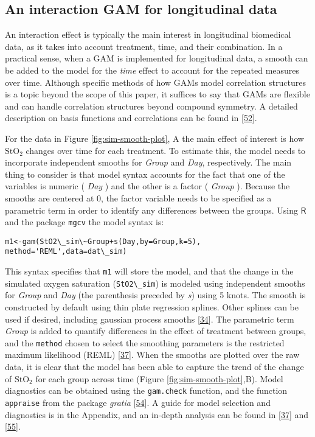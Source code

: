 \documentclass[
]{article}
\newcommand{\passthrough}[1]{#1}
\begin{document}
\hypertarget{an-interaction-gam-for-longitudinal-data}{%
\subsection{An interaction GAM for longitudinal data}\label{an-interaction-gam-for-longitudinal-data}}

An interaction effect is typically the main interest in longitudinal biomedical data, as it takes into account treatment, time, and their combination. In a practical sense, when a GAM is implemented for longitudinal data, a smooth can be added to the model for the \emph{time} effect to account for the repeated measures over time. Although specific methods of how GAMs model correlation structures is a topic beyond the scope of this paper, it suffices to say that GAMs are flexible and can handle correlation structures beyond compound symmetry. A detailed description on basis functions and correlations can be found in {[}\protect\hyperlink{ref-hefley2017}{52}{]}.

For the data in Figure \ref{fig:sim-smooth-plot}, A the main effect of interest is how \(\mbox{StO}_2\) changes over time for each treatment. To estimate this, the model needs to incorporate independent smooths for \emph{Group} and \emph{Day}, respectively. The main thing to consider is that model syntax accounts for the fact that one of the variables is numeric ( \emph{Day} ) and the other is a factor ( \emph{Group} ). Because the smooths are centered at 0, the factor variable needs to be specified as a parametric term in order to identify any differences between the groups. Using \(\textsf{R}\) and the package \passthrough{\lstinline!mgcv!} the model syntax is:

\passthrough{\lstinline!m1<-gam(StO2\_sim\~Group+s(Day,by=Group,k=5), method='REML',data=dat\_sim)!}

This syntax specifies that \passthrough{\lstinline!m1!} will store the model, and that the change in the simulated oxygen saturation (\passthrough{\lstinline!StO2\_sim!}) is modeled using independent smooths for \emph{Group} and \emph{Day} (the parenthesis preceded by \emph{s}) using 5 knots. The smooth is constructed by default using thin plate regression splines. Other splines can be used if desired, including gaussian process smooths {[}\protect\hyperlink{ref-simpson2018}{34}{]}. The parametric term \emph{Group} is added to quantify differences in the effect of treatment between groups, and the \passthrough{\lstinline!method!} chosen to select the smoothing parameters is the restricted maximum likelihood (REML) {[}\protect\hyperlink{ref-wood2017}{37}{]}. When the smooths are plotted over the raw data, it is clear that the model has been able to capture the trend of the change of \(\mbox{StO}_2\) for each group across time (Figure \ref{fig:sim-smooth-plot},B). Model diagnostics can be obtained using the \passthrough{\lstinline!gam.check!} function, and the function \passthrough{\lstinline!appraise!} from the package \emph{gratia} {[}\protect\hyperlink{ref-gratia}{54}{]}. A guide for model selection and diagnostics is in the Appendix, and an in-depth analysis can be found in {[}\protect\hyperlink{ref-wood2017}{37}{]} and {[}\protect\hyperlink{ref-harezlak2018}{55}{]}.
\end{document}
